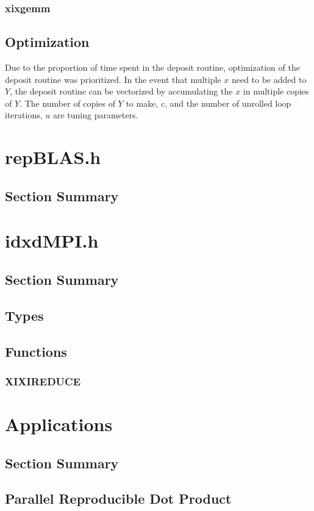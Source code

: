 \documentclass[12pt]{article}
\theoremstyle{definition}
\numberwithin{equation}{section}
\numberwithin{figure}{section}
\begin{document}
    \subsubsection{xixgemm}
  \subsection{Optimization}
    Due to the proportion of time spent in the deposit routine, optimization of the deposit routine was prioritized. In the event that multiple $x$ need to be added to $Y$, the deposit routine can be vectorized by accumulating the $x$ in multiple copies of $Y$. The number of copies of $Y$ to make, $c$, and the number of unrolled loop iterations, $u$ are tuning parameters.
\section{repBLAS.h}
  \subsection{Section Summary}
\section{idxdMPI.h}
  \subsection{Section Summary}
  \subsection{Types}
  \subsection{Functions}
    \subsubsection{XIXIREDUCE}
\section{Applications}
  \subsection{Section Summary}
  \subsection{Parallel Reproducible Dot Product}
\end{document}
